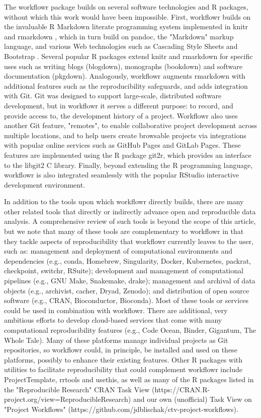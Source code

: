 \documentclass[9pt,a4paper]{extarticle}
\begin{document}
The workflowr package builds on several software technologies and R
packages, without which this work would have been impossible. First,
workflowr builds on the invaluable R Markdown literate programming
system implemented in knitr \cite{Xie2014, knitr} and rmarkdown
\cite{Xie2018, rmarkdown}, which in turn build on pandoc, the "Markdown"
markup language, and various Web technologies such as Cascading Style
Sheets and Bootstrap \cite{Spurlock2013}. Several popular R packages
extend knitr and rmarkdown for specific uses such as writing blogs
(blogdown), monographs (bookdown) and software documentation (pkgdown).
Analogously, workflowr augments rmarkdown with additional features such
as the reproducibility safeguards, and adds integration with Git. Git
was designed to support large-scale, distributed software development,
but in workflowr it serves a different purpose: to record, and provide
access to, the development history of a project. Workflowr also uses
another Git feature, "remotes", to enable collaborative project
development across multiple locations, and to help users create
browsable projects via integrations with popular online services such as
GitHub Pages and GitLab Pages. These features are implemented using the
R package git2r, which provides an interface to the libgit2 C library.
Finally, beyond extending the R programming language, workflowr is also
integrated seamlessly with the popular RStudio interactive development
environment.

In addition to the tools upon which workflowr directly builds, there are
many other related tools that directly or indirectly advance open and
reproducible data analysis. A comprehensive review of such tools is
beyond the scope of this article, but we note that many of these tools
are complementary to workflowr in that they tackle aspects of
reproducibility that workflowr currently leaves to the user, such as:
management and deployment of computational environments and dependencies
(e.g., conda, Homebrew, Singularity, Docker, Kubernetes, packrat,
checkpoint, switchr, RSuite); development and management of
computational pipelines (e.g., GNU Make, Snakemake, drake); management
and archival of data objects (e.g., archivist, cacher, Dryad, Zenodo);
and distribution of open source software (e.g., CRAN, Bioconductor,
Bioconda). Most of these tools or services could be used in combination
with workflowr. There are additional, very ambitious efforts to develop
cloud-based services that come with many computational reproducibility
features (e.g., Code Ocean, Binder, Gigantum, The Whole Tale). Many of
these platforms manage individual projects as Git repositories, so
workflowr could, in principle, be installed and used on these platforms,
possibly to enhance their existing features. Other R packages with
utilities to facilitate reproducibility that could complement workflowr
include ProjectTemplate, rrtools and usethis, as well as many of the R
packages listed in the "Reproducible Research" CRAN Task View
(https://CRAN.R-project.org/view=ReproducibleResearch) and our own
(unofficial) Task View on "Project Workflows"
(https://github.com/jdblischak/ctv-project-workflows).
\end{document}
